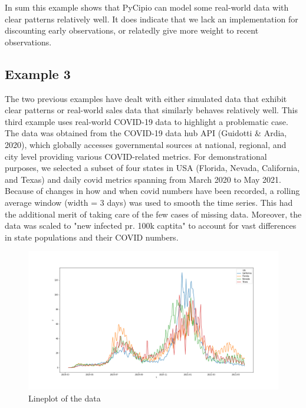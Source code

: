\documentclass{article}
\begin{document}
In sum this example shows that PyCipio can model some real-world data with clear patterns relatively well. It does indicate that we lack an implementation for discounting early observations, or relatedly give more weight to recent observations. 

\subsection{Example 3}

The two previous examples have dealt with either simulated data that exhibit clear patterns or real-world sales data that similarly behaves relatively well. This third example uses real-world COVID-19 data to highlight a problematic case. The data was obtained from the COVID-19 data hub API (Guidotti \& Ardia, 2020), which globally accesses governmental sources at national, regional, and city level providing various COVID-related metrics. For demonstrational purposes, we selected a subset of four states in USA (Florida, Nevada, California, and Texas) and daily covid metrics spanning from March 2020 to May 2021. Because of changes in how and when covid numbers have been recorded, a rolling average window (width = 3 days) was used to smooth the time series. This had the additional merit of taking care of the few cases of missing data. Moreover, the data was scaled to "new infected pr. 100k captita" to account for vast differences in state populations and their COVID numbers.  

\begin{figure}[H]
    \centerline{\includegraphics[scale = 0.45]{../plots/ex3_raw_data.png}}
    \caption{Lineplot of the data}
\end{figure}
\end{document}
